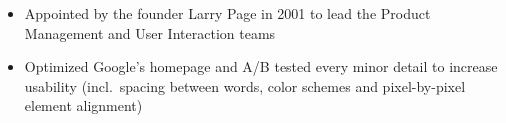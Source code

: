 \documentclass[10pt,a4paper,academicons]{altacv}
\begin{document}
\begin{itemize}
\item Appointed by the founder Larry Page in 2001 to lead the Product Management and User Interaction teams
\item Optimized Google's homepage and A/B tested every minor detail to increase usability (incl.~spacing between words, color schemes and pixel-by-pixel element alignment)
\end{itemize}


\nocite{*}

\printbibliography[heading=pubtype,title={\printinfo{\faBook}{Books}},type=book]

\printbibliography[heading=pubtype,title={\printinfo{\faFileTextO}{Journal Articles}}, type=article]

\printbibliography[heading=pubtype,title={\printinfo{\faGroup}{Conference Proceedings}},type=inproceedings]
\end{document}
